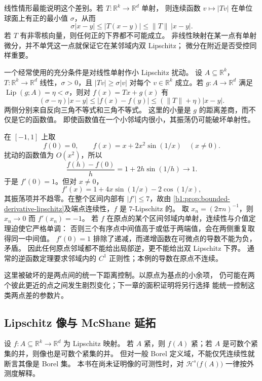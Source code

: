 \ProseParagraphBreak

线性情形最能说明这个差别。若 \(T:\mathbb R^k\rightarrow\mathbb R^d\) 单射，
则连续函数 \(v\mapsto|Tv|\) 在单位球面上有正的最小值 \(\sigma\)，从而
\[
 \sigma|x-y|\leq|T(x-y)|\leq\|T\|\,|x-y|.
\]
若 \(T\) 有非零核向量，则任何正的下界都不可能成立。
非线性映射在某一点有单射微分，并不单凭这一点就保证它在某邻域内双 Lipschitz；
微分在附近是否受控同样重要。

\ProseParagraphBreak

一个经常使用的充分条件是对线性单射作小 Lipschitz 扰动。
设 \(A\subseteq\mathbb R^k\)，\(T:\mathbb R^k\to\mathbb R^d\) 线性，\(\sigma>0\)，且 \(|Tv|\geq\sigma|v|\) 对每个 \(v\in\mathbb R^k\) 成立。若 \(g:A\rightarrow\mathbb R^d\) 满足
\(\operatorname{Lip}(g;A)=\eta<\sigma\)，则对 \(f(x)=Tx+g(x)\) 有
\[
 (\sigma-\eta)|x-y|
 \leq|f(x)-f(y)|
 \leq(\|T\|+\eta)|x-y|.
\]
两侧分别来自反向三角不等式和三角不等式。
这里的小量是 \(g\) 的距离差商，而不仅是它的函数值。
即使函数值在一个小邻域内很小，其振荡仍可能破坏单射性。


\begin{proposition}[一点非退化而无局部逆]\label{b1:eg:point-derivative-no-local-inverse}
在 \([-1,1]\) 上取
\[
 f(0)=0,\qquad f(x)=x+2x^2\sin(1/x)\quad(x\ne0).
\]
扰动的函数值为 \(O(x^2)\)，所以
\[
 \frac{f(h)-f(0)}h=1+2h\sin(1/h)\longrightarrow1.
\]
于是 \(f'(0)=1\)。但对 \(x\ne0\)，
\[
 f'(x)=1+4x\sin(1/x)-2\cos(1/x),
\]
其振荡项并不趋零。在整个区间内部有 \(|f'|\le7\)，故由
\cref{b1:prop:bounded-derivative-lipschitz}及端点连续性，\(f\) 是 \(7\)-Lipschitz 的。
取 \(x_n=(2\pi n)^{-1}\)，则 \(x_n\to0\) 而 \(f'(x_n)=-1\)。
若 \(f\) 在原点的某个区间邻域内单射，连续性与介值定理迫使它严格单调：
否则三个有序点中间值高于或低于两端值，会在两侧重复取得同一中间值。
\(f'(0)=1\) 排除了递减，而递增函数在可微点的导数不能为负，矛盾。
因此任何原点邻域都不能给出局部逆，更不能给出双 Lipschitz 下界。
通常的逆函数定理要求邻域内的 \(C^1\) 正则性；本例的导数在原点不连续。
\end{proposition}

这里被破坏的是两点间的统一下距离控制。以原点为基点的小余项，
仍可能在两个彼此更近的点之间发生剧烈变化；下一章的面积证明将另行选择
能统一控制这类两点差的参数片。

\subsection{Lipschitz 像与 McShane 延拓}
\label{b1:subsec:160103}

设 \(f:A\subseteq\mathbb R^k\rightarrow\mathbb R^d\) 为 Lipschitz 映射。
若 \(A\) 紧，则 \(f(A)\) 紧；若 \(A\) 是可数个紧集的并，则像也是可数个紧集的并。
但对一般 Borel 定义域，不能仅凭连续性就断言其像是 Borel 集。
本书在尚未证明像的可测性时，对 \(\mathcal H^s\bigl(f(A)\bigr)\) 一律按外测度解释。

